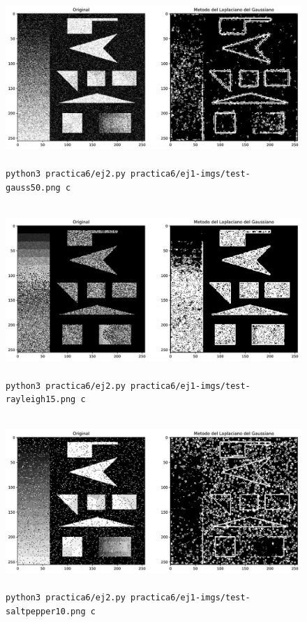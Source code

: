 \documentclass[11pt, spanish]{article}
\begin{document}
\begin{figure}[H]
\centering
    \includegraphics[height=6.5cm]{informe-imgs/ej2-c-test-gauss50.jpg}
    \caption{\texttt{python3 practica6/ej2.py practica6/ej1-imgs/test-gauss50.png c}}
\end{figure}

\begin{figure}[H]
\centering
    \includegraphics[height=6.5cm]{informe-imgs/ej2-c-test-rayleigh15.jpg}
    \caption{\texttt{python3 practica6/ej2.py practica6/ej1-imgs/test-rayleigh15.png c}}
\end{figure}

\begin{figure}[H]
\centering
    \includegraphics[height=6.5cm]{informe-imgs/ej2-c-test-saltpepper10.jpg}
    \caption{\texttt{python3 practica6/ej2.py practica6/ej1-imgs/test-saltpepper10.png c}}
\end{figure}
\end{document}
